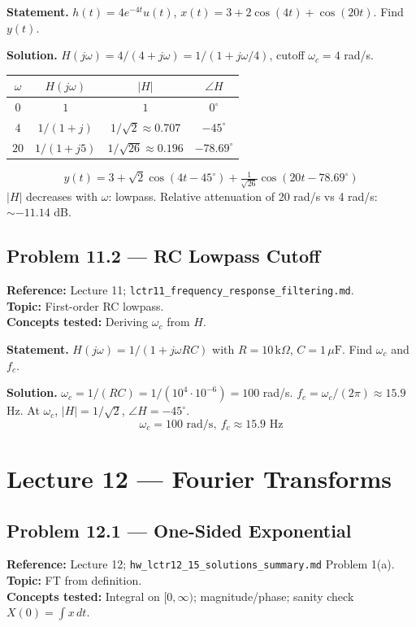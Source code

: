 \documentclass[11pt]{article}
\begin{document}
\textbf{Statement.} $h(t) = 4 e^{-4t}u(t)$, $x(t) = 3 + 2\cos(4t) + \cos(20t)$. Find $y(t)$.

\textbf{Solution.}
$H(j\omega) = 4/(4+j\omega) = 1/(1+j\omega/4)$, cutoff $\omega_c = 4$ rad/s.
\begin{center}
\begin{tabular}{|c|c|c|c|}
\hline
$\omega$ & $H(j\omega)$ & $|H|$ & $\angle H$\\
\hline
$0$ & $1$ & $1$ & $0^\circ$\\
$4$ & $1/(1+j)$ & $1/\sqrt{2}\approx 0.707$ & $-45^\circ$\\
$20$ & $1/(1+j5)$ & $1/\sqrt{26}\approx 0.196$ & $-78.69^\circ$\\
\hline
\end{tabular}
\end{center}
\[
\boxed{\,y(t) = 3 + \sqrt{2}\cos(4t-45^\circ) + \tfrac{1}{\sqrt{26}}\cos(20t-78.69^\circ)\,}
\]
$|H|$ decreases with $\omega$: lowpass. Relative attenuation of 20 rad/s vs 4 rad/s: $\sim -11.14$ dB.

\subsection{Problem 11.2 --- RC Lowpass Cutoff}
\textbf{Reference:} Lecture 11; \texttt{lctr11\_frequency\_response\_filtering.md}.\\
\textbf{Topic:} First-order RC lowpass.\\
\textbf{Concepts tested:} Deriving $\omega_c$ from $H$.

\textbf{Statement.} $H(j\omega) = 1/(1+j\omega RC)$ with $R=10\,\mathrm{k}\Omega$, $C=1\,\mu\mathrm{F}$. Find $\omega_c$ and $f_c$.

\textbf{Solution.}
$\omega_c = 1/(RC) = 1/(10^4\cdot 10^{-6}) = 100$ rad/s. $f_c = \omega_c/(2\pi)\approx 15.9$ Hz. At $\omega_c$, $|H|=1/\sqrt{2}$, $\angle H=-45^\circ$.
\[
\boxed{\,\omega_c = 100\text{ rad/s},\ f_c\approx 15.9\text{ Hz}\,}
\]

\section{Lecture 12 --- Fourier Transforms}

\subsection{Problem 12.1 --- One-Sided Exponential}
\textbf{Reference:} Lecture 12; \texttt{hw\_lctr12\_15\_solutions\_summary.md} Problem 1(a).\\
\textbf{Topic:} FT from definition.\\
\textbf{Concepts tested:} Integral on $[0,\infty)$; magnitude/phase; sanity check $X(0)=\int x\,dt$.
\end{document}
